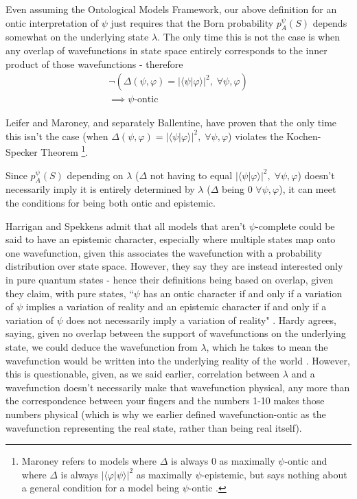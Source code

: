 \documentclass[superscriptaddress, floatfix,nofootinbib,12pt]{revtex4-2}
\newcommand{\braket}[2]{\langle #1|#2 \rangle}
\begin{document}
Even assuming the Ontological Models Framework, our above definition for an ontic interpretation of $\psi$ just requires that the Born probability $p^\psi_A(S)$ depends somewhat on the underlying state $\lambda$. The only time this is not the case is when any overlap of wavefunctions in state space entirely corresponds to the inner product of those wavefunctions - therefore
\begin{equation}
\begin{split}
    \neg(\Delta(\psi,\varphi)=\vert\braket{\psi}{\varphi}\vert^2,\;\forall\psi,\varphi)\\
    \implies\psi\text{-ontic}
    \end{split}
\end{equation}

Leifer and Maroney, and separately Ballentine, have proven that the only time this isn't the case (when $\Delta(\psi,\varphi)=\vert\braket{\psi}{\varphi}\vert^2,\;\forall\psi,\varphi$) violates the Kochen-Specker Theorem \cite{Leifer2013MaxEpist,Ballentine2014Ontological} \footnote{Maroney refers to models where $\Delta$ is always 0 as maximally $\psi$-ontic and where $\Delta$ is always $\vert\braket{\varphi}{\psi}\vert^2$ as maximally $\psi$-epistemic, but says nothing about a general condition for a model being $\psi$-ontic \cite{Maroney2012Statistical}.}.

Since $p^\psi_A(S)$ depending on $\lambda$ ($\Delta$ not having to equal $\vert\braket{\psi}{\varphi}\vert^2,\;\forall\psi,\varphi$) doesn't necessarily imply it is entirely determined by $\lambda$ ($\Delta$ being 0 $\forall\psi,\varphi$), it can meet the conditions for being both ontic and epistemic.

Harrigan and Spekkens admit that all models that aren't $\psi$-complete could be said to have an epistemic character, especially where multiple states map onto one wavefunction, given this associates the wavefunction with a probability distribution over state space. However, they say they are instead interested only in pure quantum states - hence their definitions being based on overlap, given they claim, with pure states, ``$\psi$ has an ontic character if and only if a variation of $\psi$ implies a variation of reality and an epistemic character if and only if a variation of $\psi$ does not necessarily imply a variation of reality" \cite{Harrigan2010Nonlocality}. Hardy agrees, saying, given no overlap between the support of wavefunctions on the underlying state, we could deduce the wavefunction from $\lambda$, which he takes to mean the wavefunction would be written into the underlying reality of the world \cite{Hardy2013QStatesReal}. However, this is questionable, given, as we said earlier, correlation between $\lambda$ and a wavefunction doesn't necessarily make that wavefunction physical, any more than the correspondence between your fingers and the numbers 1-10 makes those numbers physical \cite{Schlosshauer2012Implications} (which is why we earlier defined wavefunction-ontic as the wavefunction representing the real state, rather than being real itself).
\end{document}
